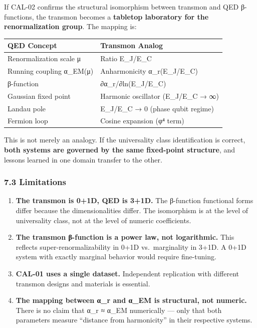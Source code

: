 \documentclass[
]{article}
\newcounter{none} %
\providecommand{\tightlist}{%
  \setlength{\itemsep}{0pt}\setlength{\parskip}{0pt}}
\begin{document}
If CAL-02 confirms the structural isomorphism between transmon and QED
β-functions, the transmon becomes a \textbf{tabletop laboratory for the
renormalization group}. The mapping is:

{\def\LTcaptype{none} %
\begin{longtable}[]{@{}ll@{}}
\toprule\noalign{}
QED Concept & Transmon Analog \\
\midrule\noalign{}
\endhead
\bottomrule\noalign{}
\endlastfoot
Renormalization scale μ & Ratio E\_J/E\_C \\
Running coupling α\_EM(μ) & Anharmonicity α\_r(E\_J/E\_C) \\
β-function & ∂α\_r/∂ln(E\_J/E\_C) \\
Gaussian fixed point & Harmonic oscillator (E\_J/E\_C → ∞) \\
Landau pole & E\_J/E\_C → 0 (phase qubit regime) \\
Fermion loop & Cosine expansion (φ⁴ term) \\
\end{longtable}
}

This is not merely an analogy. If the universality class identification
is correct, \textbf{both systems are governed by the same fixed-point
structure}, and lessons learned in one domain transfer to the other.

\subsubsection{7.3 Limitations}\label{limitations}

\begin{enumerate}
\def\labelenumi{\arabic{enumi}.}
\tightlist
\item
  \textbf{The transmon is 0+1D, QED is 3+1D.} The β-function functional
  forms differ because the dimensionalities differ. The isomorphism is
  at the level of universality class, not at the level of numeric
  coefficients.
\item
  \textbf{The transmon β-function is a power law, not logarithmic.} This
  reflects super-renormalizability in 0+1D vs.~marginality in 3+1D. A
  0+1D system with exactly marginal behavior would require fine-tuning.
\item
  \textbf{CAL-01 uses a single dataset.} Independent replication with
  different transmon designs and materials is essential.
\item
  \textbf{The mapping between α\_r and α\_EM is structural, not
  numeric.} There is no claim that α\_r ≈ α\_EM numerically --- only
  that both parameters measure ``distance from harmonicity'' in their
  respective systems.
\end{enumerate}
\end{document}
